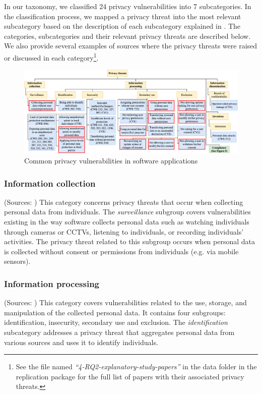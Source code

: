 In our taxonomy, we classified 24 privacy vulnerabilities into 7 subcategories. In the classification process, we mapped a privacy threat into the most relevant subcategory based on the description of each subcategory explained in \cite{Stallings2019}. The categories, subcategories and their relevant privacy threats are described below. We also provide several examples of sources where the privacy threats were raised or discussed in each category\footnote{See the file named \emph{``4-RQ2-explanatory-study-papers''} in the data folder in the replication package for the full list of papers with their associated privacy threats.}.

\begin{figure}
	\centering
	\includegraphics[width=1.0\linewidth]{figures/taxonomy.png}
	\caption{Common privacy vulnerabilities in software applications}
	\label{fig:AOC-vulnerabilities}
\end{figure}


\subsubsection{\textbf{Information collection}} (Sources: \cite{De2016, Lebeck2018, Hasan2020, OfficeJournaloftheEuropeanUnion;2016, ISO/IEC2011, OWASPsurvey}) This category concerns privacy threats that occur when collecting personal data from individuals. The \emph{surveillance} subgroup covers vulnerabilities existing in the way software collects personal data such as watching individuals through cameras or CCTVs, listening to individuals, or recording individuals' activities. The privacy threat related to this subgroup occurs when personal data is collected without consent or permissions from individuals (e.g. via mobile sensors).

\subsubsection{\textbf{Information processing}} (Sources: \cite{Deng2011, Fisk2015, Figueiredo2017, Venkatadri2018, Some2019, Zhang2020a, HIPAA, GLBA}) This category covers vulnerabilities related to the use, storage, and manipulation of the collected personal data. It contains four subgroups: identification, insecurity, secondary use and exclusion. The \emph{identification} subcategory addresses a privacy threat that aggregates personal data from various sources and uses it to identify individuals.

